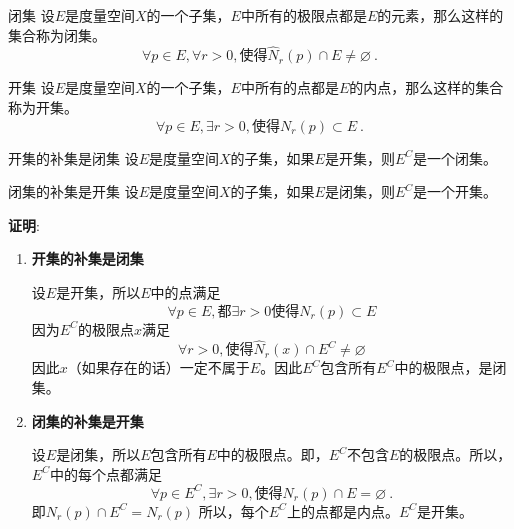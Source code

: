\begin{definition}{闭集}
设$E$是度量空间$X$的一个子集，$E$中所有的极限点都是$E$的元素，那么这样的集合称为闭集。
\begin{equation}
\forall{p\in{E}},\forall{r>0},\text{使得}\hat{N}_r(p)\cap{E}\not=\varnothing~.
\end{equation}
\end{definition}

\begin{definition}{开集}
设$E$是度量空间$X$的一个子集，$E$中所有的点都是$E$的内点，那么这样的集合称为开集。
\begin{equation}
\forall{p\in{E}},\exists{r>0},\text{使得}N_r(p)\subset{E}~.
\end{equation}
\end{definition}

\begin{theorem}{开集的补集是闭集}
设$E$是度量空间$X$的子集，如果$E$是开集，则$E^C$是一个闭集。
\end{theorem}

\begin{corollary}{闭集的补集是开集}
设$E$是度量空间$X$的子集，如果$E$是闭集，则$E^C$是一个开集。
\end{corollary}


\textbf{证明}:
\begin{enumerate}
\item \textbf{开集的补集是闭集}

设$E$是开集，所以$E$中的点满足
\begin{equation}
\forall{p\in{E}},\text{都}\exists{r}>0\text{使得}N_r(p)\subset{E}
\end{equation}
因为$E^C$的极限点$x$满足
\begin{equation}
\forall{r}>0,\text{使得}\hat{N}_r(x)\cap{E^C}\not=\varnothing
\end{equation}
因此$x$（如果存在的话）一定不属于$E$。因此$E^C$包含所有$E^C$中的极限点，是闭集。


\item \textbf{闭集的补集是开集}

设$E$是闭集，所以$E$包含所有$E$中的极限点。即，$E^C$不包含$E$的极限点。所以，$E^C$中的每个点都满足
\begin{equation}
\forall{p}\in{E^C},\exists{r>0},\text{使得}N_r(p)\cap{E}=\varnothing~.
\end{equation}
即$N_r(p)\cap{E^C}=N_r(p)$
所以，每个$E^C$上的点都是内点。$E^C$是开集。
\end{enumerate}

